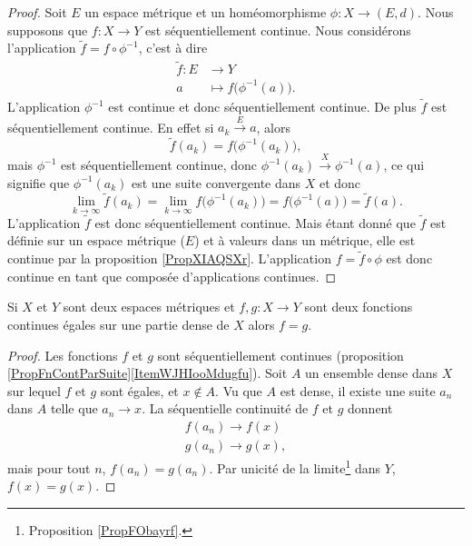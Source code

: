 \begin{proof}
    Soit \( E\) un espace métrique et un homéomorphisme \( \phi\colon X\to (E,d)\). Nous supposons que \( f\colon X\to Y\) est séquentiellement continue. Nous considérons l'application \( \tilde f=f\circ\phi^{-1}\), c'est à dire
    \begin{equation}
        \begin{aligned}
            \tilde f\colon E&\to Y \\
            a&\mapsto f\big( \phi^{-1}(a) \big). 
        \end{aligned}
    \end{equation}
    L'application \( \phi^{-1}\) est continue et donc séquentiellement continue. De plus \( \tilde f\) est séquentiellement continue. En effet si \( a_k\stackrel{E}{\longrightarrow}a\), alors
    \begin{equation}
        \tilde f(a_k)=f\big( \phi^{-1}(a_k) \big),
    \end{equation}
    mais \( \phi^{-1}\) est séquentiellement continue, donc \( \phi^{-1}(a_k)\stackrel{X}{\longrightarrow}\phi^{-1}(a)\), ce qui signifie que \( \phi^{-1}(a_k)\) est une suite convergente dans \( X\) et donc
    \begin{equation}
        \lim_{k\to \infty} \tilde f(a_k)=\lim_{k\to \infty} f\big( \phi^{-1}(a_k) \big)=f\big( \phi^{-1}(a) \big)=\tilde f(a).
    \end{equation}
    L'application \( \tilde f\) est donc séquentiellement continue. Mais étant donné que \( \tilde f\) est définie sur un espace métrique (\( E\)) et à valeurs dans un métrique, elle est continue par la proposition \ref{PropXIAQSXr}. L'application \( f=\tilde f\circ\phi\) est donc continue en tant que composée d'applications continues.
\end{proof}

\begin{proposition} \label{PropCJGIooZNpnGF}
    Si \( X\) et \( Y\) sont deux espaces métriques et \( f,g\colon X\to Y\) sont deux fonctions continues égales sur une partie dense de \( X\) alors \( f=g\).
\end{proposition}

\begin{proof}
    Les fonctions \( f\) et \( g\) sont séquentiellement continues (proposition \ref{PropFnContParSuite}\ref{ItemWJHIooMdugfu}). Soit \( A\) un ensemble dense dans \( X\) sur lequel \( f\) et \( g\) sont égales, et \( x\notin A\). Vu que \( A\) est dense, il existe une suite \( a_n\) dans \( A\) telle que \( a_n\to x\). La séquentielle continuité de \( f\) et \( g\) donnent
    \begin{subequations}
        \begin{align}
            f(a_n)\to f(x)\\
            g(a_n)\to g(x),
        \end{align}
    \end{subequations}
    mais pour tout \( n\), \( f(a_n)=g(a_n)\). Par unicité de la limite\footnote{Proposition \ref{PropFObayrf}.} dans \( Y\), \( f(x)=g(x)\).
\end{proof}

